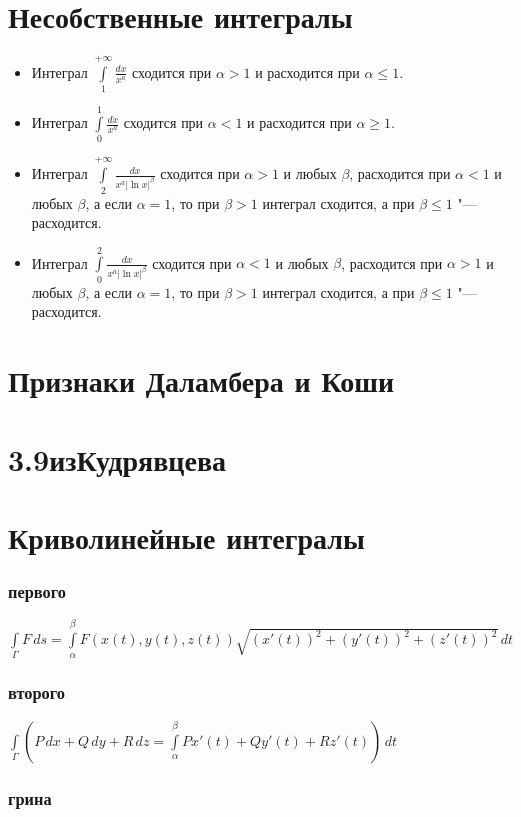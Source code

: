\section{Несобственные интегралы}
\begin{itemize}
\item
Интеграл $\int\limits_{1}^{+\infty} \frac{dx}{x^a}$ сходится при $\alpha > 1$ и расходится при $\alpha \le 1$.
\item 
Интеграл $\int\limits_{0}^{1} \frac{dx}{x^a}$ сходится при $\alpha < 1$ и расходится при $\alpha \ge 1$.
\item
Интеграл $\int\limits_{2}^{+\infty} \frac{dx}{x^a |\ln x|^{\beta}}$ сходится при $\alpha > 1$ и любых $\beta$, расходится при $\alpha < 1$ и любых $\beta$, а если $\alpha = 1$, то при $\beta > 1$ интеграл сходится, а при $\beta \le 1$ "--- расходится.
\item 
Интеграл $\int\limits_{0}^{2} \frac{dx}{x^a |\ln x|^{\beta}}$ сходится при $\alpha < 1$ и любых $\beta$, расходится при $\alpha > 1$ и любых $\beta$, а если $\alpha = 1$, то при $\beta > 1$ интеграл сходится, а при $\beta \le 1$ "--- расходится.
\end{itemize}

\section{Признаки Даламбера и Коши}

\section{3.9изКудрявцева}

\section{Криволинейные интегралы}
\subsubsection{первого}
$\int\limits_{\Gamma} F\, ds = \int\limits_{\alpha}^{\beta} F(x(t),y(t),z(t))\sqrt{(x'(t))^2+(y'(t))^2+(z'(t))^2}\,dt$
\subsubsection{второго}
$\int\limits_{\Gamma} \left(P\,dx+Q\,dy+R\,dz=\int\limits_{\alpha}^{\beta} P x'(t)+ Q y'(t)+ R z'(t)\right)\,dt$
\subsubsection{грина}


